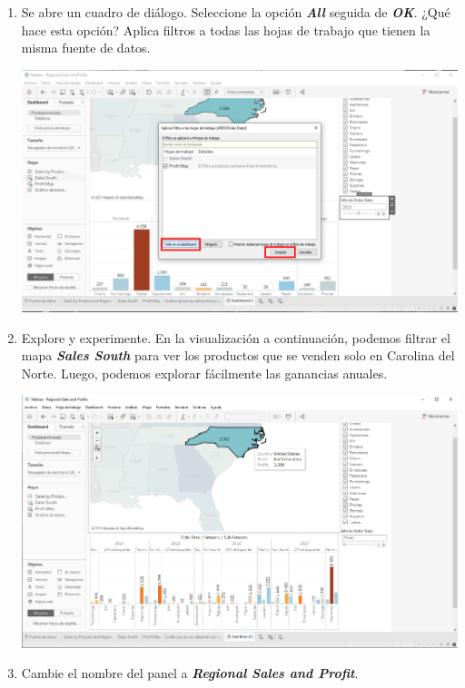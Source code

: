\documentclass[12pt,letterpaper]{article}
\begin{document}
\begin{enumerate}
\begin{center}
        \end{center}
        \item Se abre un cuadro de diálogo. Seleccione la opción \textit{\textbf{All}} seguida de \textit{\textbf{OK}}. ¿Qué hace esta opción? Aplica filtros a todas las hojas de trabajo que tienen la misma fuente de datos.
        \begin{center}
            \includegraphics[width=15cm]{./img/img84.png}
        \end{center}
        \item Explore y experimente. En la visualización a continuación, podemos filtrar el mapa \textit{\textbf{Sales South}} para ver los productos que se venden solo en Carolina del Norte. Luego, podemos explorar fácilmente las ganancias anuales.
        \begin{center}
            \includegraphics[width=15cm]{./img/img85.png}
        \end{center}
        \item Cambie el nombre del panel a \textit{\textbf{Regional Sales and Profit}}.
        \begin{center}

\end{center}
\end{enumerate}
\end{document}
